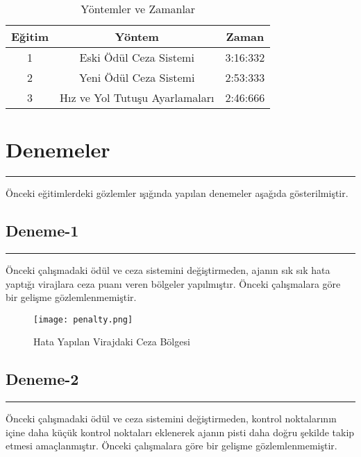 \documentclass{article}
\begin{document}
\captionsetup[table]{justification=raggedright, singlelinecheck=false}


\renewcommand{\tablename}{Tablo}
\begin{table}[h!]
\centering
  \Large %
    \caption {Yöntemler ve Zamanlar}
  \begin{tabular}{|c|c|c|}
    \hline
    Eğitim & Yöntem & Zaman \\
    \hline
    1 & Eski Ödül Ceza Sistemi & 3:16:332 \\
    \hline
    2 & Yeni Ödül Ceza Sistemi & 2:53:333 \\
    \hline
    3 & Hız ve Yol Tutuşu Ayarlamaları & 2:46:666 \\
    \hline
  \end{tabular}
\end{table}

\newpage

\section{Denemeler}
\rule{\textwidth}{0.5pt}
\par Önceki eğitimlerdeki gözlemler ışığında yapılan denemeler aşağıda gösterilmiştir.\\[5pt]

\subsection{Deneme-1}
\rule{\textwidth}{0.5pt}
\par Önceki çalışmadaki ödül ve ceza sistemini değiştirmeden, ajanın sık sık hata yaptığı virajlara ceza puanı veren bölgeler yapılmıştır. Önceki çalışmalara göre bir gelişme gözlemlenmemiştir.\\[5pt]

\begin{figure}[h]
    \begin{center}
        \texttt{[image: penalty.png]}
    \end{center}
      \caption{Hata Yapılan Virajdaki Ceza Bölgesi}
\end{figure}

\newpage

\subsection{Deneme-2}
\rule{\textwidth}{0.5pt}
\par Önceki çalışmadaki ödül ve ceza sistemini değiştirmeden, kontrol noktalarının içine daha küçük kontrol noktaları eklenerek ajanın pisti daha doğru şekilde takip etmesi amaçlanmıştır. Önceki çalışmalara göre bir gelişme gözlemlenmemiştir.
\end{document}
